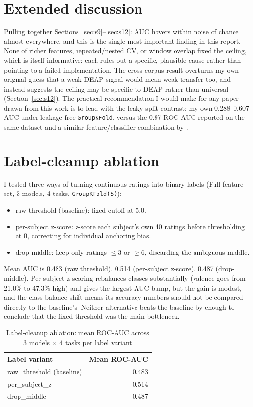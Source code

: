 \documentclass[11pt]{report}
\begin{document}
\section{Extended discussion}
\label{sec:s13}
Pulling together Sections~\ref{sec:s9}--\ref{sec:s12}: AUC hovers within
noise of chance almost everywhere, and this is the single most important
finding in this report. None of richer features, repeated/nested CV, or
window overlap fixed the ceiling, which is itself informative: each rules
out a specific, plausible cause rather than pointing to a failed
implementation. The cross-corpus result overturns my own original guess that
a weak DEAP signal would mean weak transfer too, and instead suggests the
ceiling may be specific to DEAP rather than universal (Section~\ref{sec:s12}).
The practical recommendation I would make for any paper drawn from this work
is to lead with the leaky-split contrast: my own 0.288--0.607 AUC under
leakage-free \texttt{GroupKFold}, versus the 0.97 ROC-AUC reported on the same
dataset and a similar feature/classifier combination by
\citet{hasan2025methodsx}.

\section{Label-cleanup ablation}
\label{sec:s14}
I tested three ways of turning continuous ratings into binary labels (Full
feature set, 3 models, 4 tasks, \texttt{GroupKFold(5)}):
\begin{itemize}
  \item raw threshold (baseline): fixed cutoff at 5.0.
  \item per-subject z-score: z-score each subject's own 40 ratings before
        thresholding at 0, correcting for individual anchoring bias.
  \item drop-middle: keep only ratings $\le3$ or $\ge6$, discarding the
        ambiguous middle.
\end{itemize}
Mean AUC is 0.483 (raw threshold), 0.514 (per-subject z-score), 0.487
(drop-middle). Per-subject z-scoring rebalances classes substantially
(valence goes from 21.0\% to 47.3\% high) and gives the largest AUC bump,
but the gain is modest, and the class-balance shift means its accuracy
numbers should not be compared directly to the baseline's. Neither
alternative beats the baseline by enough to conclude that the fixed
threshold was the main bottleneck.

\begin{table}[H]
\centering
\caption{Label-cleanup ablation: mean ROC-AUC across 3 models $\times$
4 tasks per label variant}
\label{tab:label-cleanup}
\begin{tabular}{lr}
\toprule
Label variant & Mean ROC-AUC \\
\midrule
raw\_threshold (baseline) & 0.483 \\
per\_subject\_z           & 0.514 \\
drop\_middle               & 0.487 \\
\bottomrule
\end{tabular}
\end{table}
\end{document}
